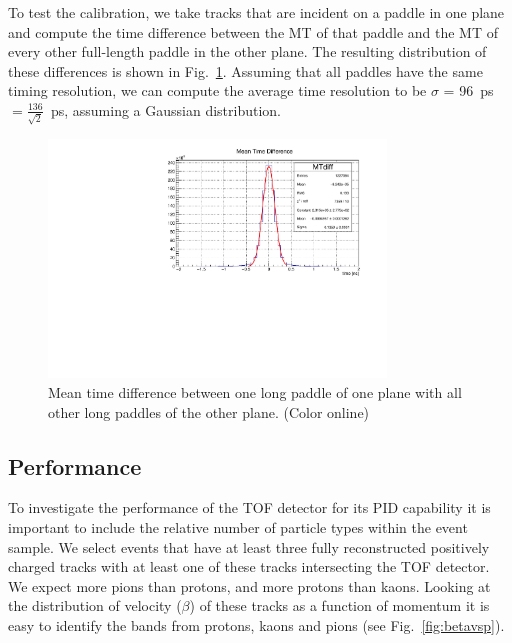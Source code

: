 To test the calibration, we take tracks that are incident on a paddle in one plane and compute the time difference between the MT of that paddle and the MT of every other full-length paddle in the other plane. The resulting distribution of these differences is shown in Fig.~\ref{fig:mt_diff}. Assuming that all paddles have the same timing resolution, we can compute the
average time resolution to be $\sigma$ = 96~ps$=\frac{136}{\sqrt{2}}$~ps, assuming a Gaussian distribution.
\begin{figure}[tbp]
\begin{center}
\includegraphics[width=0.8\textwidth]{figures/mt_diff_fullTOF.pdf}
\caption{\label{fig:mt_diff} Mean time difference between one long paddle of one plane with all other long paddles
of the other plane. (Color online)}
\end{center}
\end{figure}
\subsection{Performance \label{sec:scperformance}}
To investigate the performance of the TOF detector for its PID capability it is important to include the relative number of
particle types within the event sample. We select events that have at least three fully reconstructed positively charged tracks with at least one of these tracks intersecting the TOF detector. We expect more pions than protons, and more protons than kaons. Looking at the distribution of velocity ($\beta$) of these tracks as a function of momentum it is easy to identify the bands from protons, kaons and pions (see Fig.~\ref{fig:betavsp}). 

